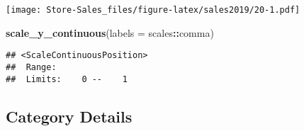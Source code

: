 \documentclass[
]{article}
\newenvironment{Shaded}{\begin{snugshade}}{\end{snugshade}}
\newcommand{\AttributeTok}[1]{\textcolor[rgb]{0.13,0.29,0.53}{#1}}
\newcommand{\FunctionTok}[1]{\textcolor[rgb]{0.13,0.29,0.53}{\textbf{#1}}}
\newcommand{\NormalTok}[1]{#1}
\newcommand{\SpecialCharTok}[1]{\textcolor[rgb]{0.81,0.36,0.00}{\textbf{#1}}}
\begin{document}
\texttt{[image: Store-Sales\_files/figure-latex/sales2019/20-1.pdf]}

\begin{Shaded}
\begin{Highlighting}[]
  \FunctionTok{scale\_y\_continuous}\NormalTok{(}\AttributeTok{labels =}\NormalTok{ scales}\SpecialCharTok{::}\NormalTok{comma)}
\end{Highlighting}
\end{Shaded}

\begin{verbatim}
## <ScaleContinuousPosition>
##  Range:  
##  Limits:    0 --    1
\end{verbatim}

\hypertarget{category-details}{%
\subsection{Category Details}\label{category-details}}
\end{document}
